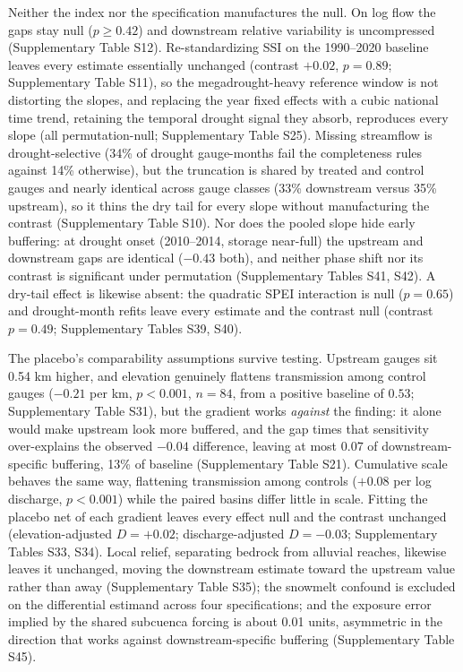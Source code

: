 \documentclass[
]{agujournal2019}
\begin{document}
Neither the index nor the specification manufactures the null. On log
flow the gaps stay null (\(p \geq 0.42\)) and downstream relative
variability is uncompressed (Supplementary Table S12). Re-standardizing
SSI on the 1990--2020 baseline leaves every estimate essentially
unchanged (contrast \(+0.02\), \(p = 0.89\); Supplementary Table S11),
so the megadrought-heavy reference window is not distorting the slopes,
and replacing the year fixed effects with a cubic national time trend,
retaining the temporal drought signal they absorb, reproduces every
slope (all permutation-null; Supplementary Table S25). Missing
streamflow is drought-selective (34\% of drought gauge-months fail the
completeness rules against 14\% otherwise), but the truncation is shared
by treated and control gauges and nearly identical across gauge classes
(33\% downstream versus 35\% upstream), so it thins the dry tail for
every slope without manufacturing the contrast (Supplementary Table
S10). Nor does the pooled slope hide early buffering: at drought onset
(2010--2014, storage near-full) the upstream and downstream gaps are
identical (\(-0.43\) both), and neither phase shift nor its contrast is
significant under permutation (Supplementary Tables S41, S42). A
dry-tail effect is likewise absent: the quadratic SPEI interaction is
null (\(p = 0.65\)) and drought-month refits leave every estimate and
the contrast null (contrast \(p = 0.49\); Supplementary Tables S39,
S40).

The placebo's comparability assumptions survive testing. Upstream gauges
sit 0.54 km higher, and elevation genuinely flattens transmission among
control gauges (\(-0.21\) per km, \(p < 0.001\), \(n = 84\), from a
positive baseline of \(0.53\); Supplementary Table S31), but the
gradient works \emph{against} the finding: it alone would make upstream
look more buffered, and the gap times that sensitivity over-explains the
observed \(-0.04\) difference, leaving at most \(0.07\) of
downstream-specific buffering, 13\% of baseline (Supplementary Table
S21). Cumulative scale behaves the same way, flattening transmission
among controls (\(+0.08\) per log discharge, \(p < 0.001\)) while the
paired basins differ little in scale. Fitting the placebo net of each
gradient leaves every effect null and the contrast unchanged
(elevation-adjusted \(D = +0.02\); discharge-adjusted \(D = -0.03\);
Supplementary Tables S33, S34). Local relief, separating bedrock from
alluvial reaches, likewise leaves it unchanged, moving the downstream
estimate toward the upstream value rather than away (Supplementary Table
S35); the snowmelt confound is excluded on the differential estimand
across four specifications; and the exposure error implied by the shared
subcuenca forcing is about 0.01 units, asymmetric in the direction that
works against downstream-specific buffering (Supplementary Table S45).
\end{document}
